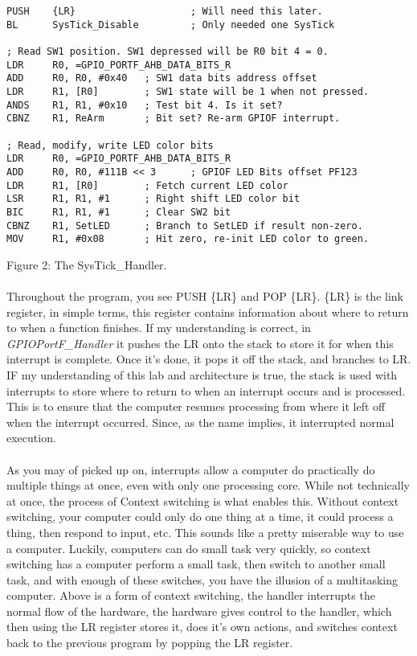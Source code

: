 \documentclass[12pt,a4paper]{report}
\begin{document}
\lstset{language=[x86masm]Assembler}
\begin{lstlisting}
PUSH    {LR}                    ; Will need this later.
BL      SysTick_Disable         ; Only needed one SysTick
        
; Read SW1 position. SW1 depressed will be R0 bit 4 = 0.
LDR     R0, =GPIO_PORTF_AHB_DATA_BITS_R
ADD     R0, R0, #0x40   ; SW1 data bits address offset
LDR     R1, [R0]        ; SW1 state will be 1 when not pressed.
ANDS    R1, R1, #0x10   ; Test bit 4. Is it set?
CBNZ    R1, ReArm       ; Bit set? Re-arm GPIOF interrupt.
        
; Read, modify, write LED color bits
LDR     R0, =GPIO_PORTF_AHB_DATA_BITS_R
ADD     R0, R0, #111B << 3      ; GPIOF LED Bits offset PF123
LDR     R1, [R0]        ; Fetch current LED color
LSR     R1, R1, #1      ; Right shift LED color bit
BIC     R1, R1, #1      ; Clear SW2 bit
CBNZ    R1, SetLED      ; Branch to SetLED if result non-zero.
MOV     R1, #0x08       ; Hit zero, re-init LED color to green.

\end{lstlisting}	
\begin{center}
\small{Figure 2: The SysTick\_Handler.}
\end{center}

\paragraph{}
Throughout the program, you see PUSH \{LR\} and POP \{LR\}. \{LR\} is the link register, in simple terms, this register contains information about where to return to when a function finishes. If my understanding is correct, in \textit{GPIOPortF\_Handler} it pushes the LR onto the stack to store it for when this interrupt is complete. Once it's done, it pops it off the stack, and branches to LR. IF my understanding of this lab and architecture is true, the stack is used with interrupts to store where to return to when an interrupt occurs and is processed. This is to ensure that the computer resumes processing from where it left off when the interrupt occurred. Since, as the name implies, it interrupted normal execution. 

\paragraph{}
As you may of picked up on, interrupts allow a computer do practically do multiple things at once, even with only one processing core. While not technically at once, the process of Context switching is what enables this. Without context switching, your computer could only do one thing at a time, it could process a thing, then respond to input, etc. This sounds like a pretty miserable way to use a computer. Luckily, computers can do small task very quickly, so context switching has a computer perform a small task, then switch to another small task, and with enough of these switches, you have the illusion of a multitasking computer. Above is a form of context switching, the handler interrupts the normal flow of the hardware, the hardware gives control to the handler, which then using the LR register stores it, does it's own actions, and switches context back to the previous program by popping the LR register. 
\end{document}
